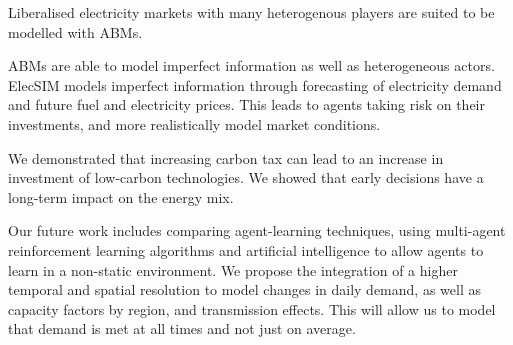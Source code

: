 

Liberalised electricity markets with many heterogenous players are suited to be modelled with ABMs.

ABMs are able to model imperfect information as well as heterogeneous actors. ElecSIM models imperfect information through forecasting of electricity demand and future fuel and electricity prices. This leads to agents taking risk on their investments, and more realistically model market conditions.

We demonstrated that increasing carbon tax can lead to an increase in investment of low-carbon technologies. We showed that early decisions have a long-term impact on the energy mix. 

Our future work includes comparing agent-learning techniques, using multi-agent reinforcement learning algorithms and artificial intelligence to allow agents to learn in a non-static environment. We propose the integration of a higher temporal and spatial resolution to model changes in daily demand, as well as capacity factors by region, and transmission effects. This will allow us to model that demand is met at all times and not just on average.


\FloatBarrier